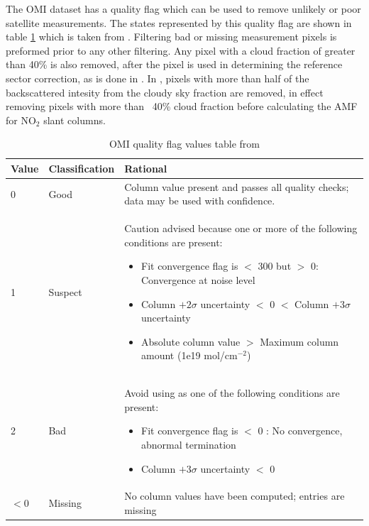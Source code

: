     The OMI dataset has a quality flag which can be used to remove unlikely or poor satellite measurements.
    The states represented by this quality flag are shown in table \ref{ch_isop:tab:OMIQualityFlag} which is taken from \citet{OMI_Readme}.
    Filtering bad or missing measurement pixels is preformed prior to any other filtering.
    Any pixel with a cloud fraction of greater than 40\% is also removed, after the pixel is used in determining the reference sector correction, as is done in \citet{Gonzalez2015, DeSmedt2015}.
    In \citet{Martin2003}, pixels with more than half of the backscattered intesity from the cloudy sky fraction are removed, in effect removing pixels with more than ~40\% cloud fraction before calculating the AMF for NO$_2$ slant columns. 
    
    \begin{table}[H]
    \begin{tabular}{ | l | l | p{10cm} |}
      \hline
      \textbf{Value} & \textbf{Classification} & \textbf{Rational} 
      \\ \hline
      0 & Good & Column value present and passes all quality checks; data may be used with confidence. 
      \\ \hline
      1 & Suspect & Caution advised because one or more of the following conditions are present: 
        \begin{itemize}
          \item Fit convergence flag is $<$ 300 but $>$ 0: Convergence at noise level
          \item Column $+ 2 \sigma$ uncertainty $<$ 0 $<$ Column $ + 3 \sigma $ uncertainty
          \item Absolute column value $>$ Maximum column amount (1e19 mol/cm$^{-2}$)
        \end{itemize}
      \\ \hline
      2 & Bad & Avoid using as one of the following conditions are present: 
        \begin{itemize}
          \item Fit convergence flag is $<$ 0 : No convergence, abnormal termination
          \item Column $+ 3 \sigma$ uncertainty $<$ 0
        \end{itemize}
      \\ \hline
      $<0$ & Missing & No column values have been computed; entries are missing
      \\ \hline
    \end{tabular}
    \caption{OMI quality flag values table from \citet{OMI_Readme}}
    \label{ch_isop:tab:OMIQualityFlag}
    \end{table}
    
